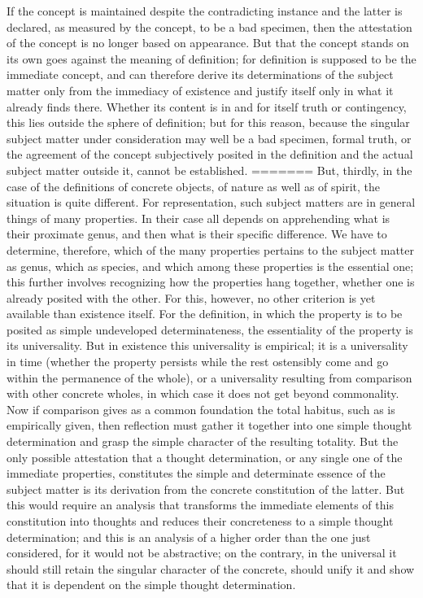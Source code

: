 If the concept is maintained despite the contradicting instance and the
latter is declared, as measured by the concept, to be a bad specimen, then
the attestation of the concept is no longer based on appearance. But that
the concept stands on its own goes against the meaning of definition;
for definition is supposed to be the immediate concept, and can therefore
derive its determinations of the subject matter only from the immediacy of
existence and justify itself only in what it already finds there.
Whether its
content is in and for itself truth or contingency, this lies outside the sphere
of definition; but for this reason, because the singular subject matter under
consideration may well be a bad specimen, formal truth, or the agreement
of the concept subjectively posited in the definition and the actual subject
matter outside it, cannot be established.
=======
But, thirdly, in the case of
the definitions of concrete objects,
of nature as well as of spirit,
the situation is quite different.
For representation, such subject matters are
in general things of many properties.
In their case all depends on apprehending
what is their proximate genus,
and then what is their specific difference.
We have to determine, therefore,
which of the many properties pertains
to the subject matter as genus, which as species,
and which among these properties is the essential one;
this further involves recognizing
how the properties hang together,
whether one is already posited with the other.
For this, however, no other criterion is
yet available than existence itself.
For the definition, in which the property is
to be posited as simple undeveloped determinateness,
the essentiality of the property is its universality.
But in existence this universality is empirical;
it is a universality in time
(whether the property persists while
the rest ostensibly come and go within
the permanence of the whole),
or a universality resulting from comparison
with other concrete wholes,
in which case it does not get beyond commonality.
Now if comparison gives as a common foundation
the total habitus, such as is empirically given,
then reflection must gather it together
into one simple thought determination
and grasp the simple character of the resulting totality.
But the only possible attestation that a thought determination,
or any single one of the immediate properties,
constitutes the simple and determinate
essence of the subject matter is
its derivation from the concrete constitution of the latter.
But this would require an analysis that transforms
the immediate elements of this constitution into thoughts
and reduces their concreteness to a simple thought determination;
and this is an analysis of a higher order than
the one just considered,
for it would not be abstractive;
on the contrary, in the universal it should still retain
the singular character of the concrete,
should unify it and show that it is dependent on
the simple thought determination.

